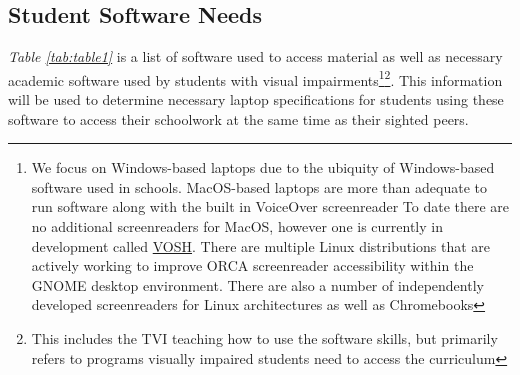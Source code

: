 \pagebreak\hypertarget{student-software-needs}{}\subsection{Student Software Needs}\label{student-software-needs}
\textit{Table \ref{tab:table1}} is a list of software used to access material as well as necessary academic software used by students with visual impairments\footnote{\raggedright We focus on Windows-based laptops due to the ubiquity of Windows-based software used in schools. MacOS-based laptops are more than adequate to run software along with the built in VoiceOver screenreader To date there are no additional screenreaders for MacOS, however one is currently in development called \href{http://youtu.be/qTkS-zNzF88?si=3XTXtbyOWD9kvwlk}{VOSH}. There are multiple Linux distributions that are actively working to improve ORCA screenreader accessibility within the GNOME desktop environment. There are also a number of independently developed screenreaders for Linux architectures as well as Chromebooks}\fnsep\footnote{\raggedright This includes the TVI teaching how to use the software skills, but primarily refers to programs visually impaired students need to access the curriculum}. This information will be used to determine necessary laptop specifications for students using these software to access their schoolwork at the same time as their sighted peers.

